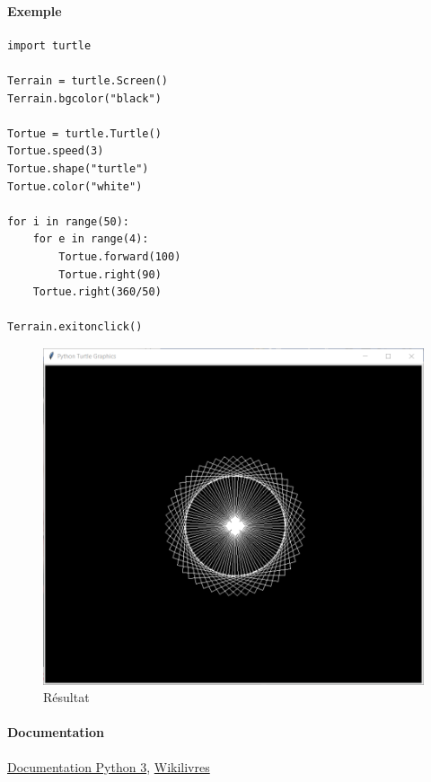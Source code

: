 \documentclass[a4paper, 10pt]{article}
\begin{document}
\paragraph{Exemple}
\begin{verbatim}
import turtle

Terrain = turtle.Screen()
Terrain.bgcolor("black")

Tortue = turtle.Turtle()
Tortue.speed(3)
Tortue.shape("turtle")
Tortue.color("white")

for i in range(50):
    for e in range(4):
        Tortue.forward(100)
        Tortue.right(90)
    Tortue.right(360/50)

Terrain.exitonclick()
\end{verbatim}

\begin{figure}[h]
\begin{center}
\includegraphics[scale=0.5]{turtle.PNG}
\caption*{Résultat}
\end{center}
\end{figure}

\paragraph{Documentation} \href{https://docs.python.org/fr/3.6/library/turtle.html#methods-specific-to-screen-not-inherited-from-turtlescreen}{Documentation Python 3}, \href{https://fr.wikibooks.org/wiki/Programmation_Python/Turtle}{Wikilivres}
\end{document}

